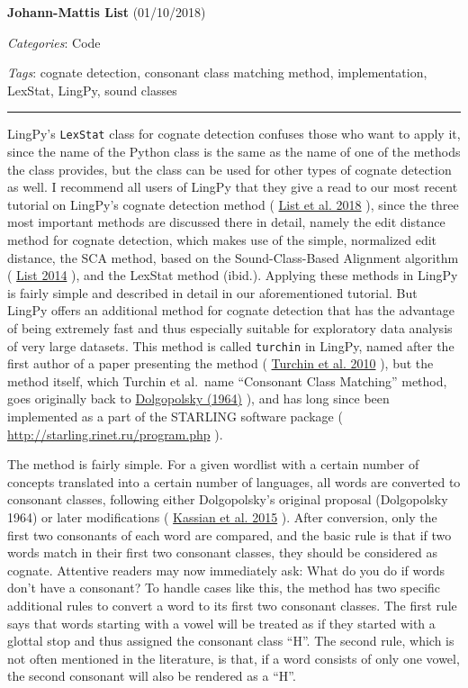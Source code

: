 \documentclass[
  english,
  a4paper,
  oneside,tablecaptionabove
]{scrbook}
\newcommand{\passthrough}[1]{#1}
\begin{document}
\textbf{Johann-Mattis List} (01/10/2018)

\emph{Categories}: Code

\emph{Tags}: cognate detection, consonant class matching method,
implementation, LexStat, LingPy, sound classes

\begin{center}\rule{0.5\linewidth}{\linethickness}\end{center}

LingPy's \passthrough{\lstinline!LexStat!} class for cognate detection
confuses those who want to apply it, since the name of the Python class
is the same as the name of one of the methods the class provides, but
the class can be used for other types of cognate detection as well. I
recommend all users of LingPy that they give a read to our most recent
tutorial on LingPy's cognate detection method (
\href{http://bibliography.lingpy.org?key=List2018d}{List et al. 2018} ),
since the three most important methods are discussed there in detail,
namely the edit distance method for cognate detection, which makes use
of the simple, normalized edit distance, the SCA method, based on the
Sound-Class-Based Alignment algorithm (
\href{http://bibliography.lingpy.org?key=List2014d}{List 2014} ), and
the LexStat method (ibid.). Applying these methods in LingPy is fairly
simple and described in detail in our aforementioned tutorial. But
LingPy offers an additional method for cognate detection that has the
advantage of being extremely fast and thus especially suitable for
exploratory data analysis of very large datasets. This method is called
\passthrough{\lstinline!turchin!} in LingPy, named after the first
author of a paper presenting the method (
\href{http://bibliography.lingpy.org?key=Turchin2010}{Turchin et al.
2010} ), but the method itself, which Turchin et al.~name
\enquote{Consonant Class Matching} method, goes originally back to
\href{http://bibliography.lingpy.org?key=Dolgopolsky1964}{Dolgopolsky
(1964)} ), and has long since been implemented as a part of the STARLING
software package (
\href{http://starling.rinet.ru/program.php?lan=en}{http://starling.rinet.ru/program.php}
). \protect\hypertarget{more-477}{}{}

The method is fairly simple. For a given wordlist with a certain number
of concepts translated into a certain number of languages, all words are
converted to consonant classes, following either Dolgopolsky's original
proposal (Dolgopolsky 1964) or later modifications (
\href{http://bibliography.lingpy.org?key=Kassian2015b}{Kassian et al.
2015} ). After conversion, only the first two consonants of each word
are compared, and the basic rule is that if two words match in their
first two consonant classes, they should be considered as cognate.
Attentive readers may now immediately ask: What do you do if words don't
have a consonant? To handle cases like this, the method has two specific
additional rules to convert a word to its first two consonant classes.
The first rule says that words starting with a vowel will be treated as
if they started with a glottal stop and thus assigned the consonant
class \enquote{H}. The second rule, which is not often mentioned in the
literature, is that, if a word consists of only one vowel, the second
consonant will also be rendered as a \enquote{H}.
\end{document}
